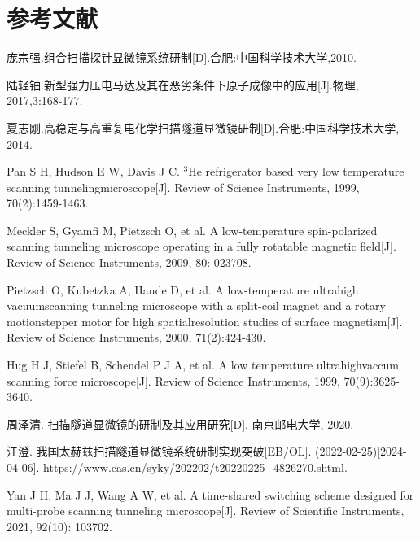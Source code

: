 \documentclass{article}
\begin{document}
\newpage
{}
\section*{参考文献} %
\begingroup  %
\renewcommand{\section}[2]{} 
\begin{thebibliography}{25}
	
	 庞宗强.组合扫描探针显微镜系统研制[D].合肥:中国科学技术大学,2010.
	
	 陆轻铀.新型强力压电马达及其在恶劣条件下原子成像中的应用[J].物理, 2017,3:168-177.
	
	 夏志刚.高稳定与高重复电化学扫描隧道显微镜研制[D].合肥:中国科学技术大学, 2014.
	
	 Pan S H, Hudson E W, Davis J C. $^\text{3}$He refrigerator based very low temperature scanning tunnelingmicroscope[J]. Review of Science Instruments, 1999, 70(2):1459-1463.
	
	 Meckler S, Gyamfi M, Pietzsch O, et al. A low-temperature spin-polarized scanning tunneling microscope operating in a fully rotatable magnetic field[J]. Review of Science Instruments, 2009, 80: 023708.
	
	 Pietzsch O, Kubetzka A, Haude D, et al. A low-temperature ultrahigh vacuumscanning tunneling microscope with a split-coil magnet and a rotary motionstepper motor for high spatialresolution studies of surface magnetism[J]. Review of Science Instruments, 2000, 71(2):424-430.
	
	Hug H J, Stiefel B, Schendel P J A, et al. A low temperature ultrahighvaccum scanning force microscope[J]. Review of Science Instruments, 1999, 70(9):3625-3640.
	
	 周泽清. 扫描隧道显微镜的研制及其应用研究[D]. 南京邮电大学, 2020.
	
	 江澄. 我国太赫兹扫描隧道显微镜系统研制实现突破[EB/OL]. (2022-02-25)[2024-04-06]. \href{https://www.cas.cn/syky/202202/t20220225\_4826270.shtml}{https://www.cas.cn/syky/202202/t20220225\_4826270.shtml}.
	
	 Yan J H, Ma J J, Wang A W, et al. A time-shared switching scheme designed for multi-probe scanning tunneling microscope[J]. Review of Scientific Instruments, 2021, 92(10): 103702.
	

\end{thebibliography}
\end{document}
